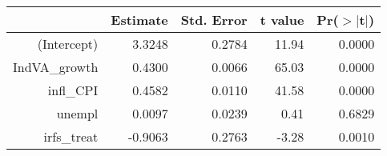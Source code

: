 \begin{table}[ht]
\centering
\begin{tabular}{rrrrr}
  \hline
 & Estimate & Std. Error & t value & Pr($>$$|$t$|$) \\ 
  \hline
(Intercept) & 3.3248 & 0.2784 & 11.94 & 0.0000 \\ 
  IndVA\_growth & 0.4300 & 0.0066 & 65.03 & 0.0000 \\ 
  infl\_CPI & 0.4582 & 0.0110 & 41.58 & 0.0000 \\ 
  unempl & 0.0097 & 0.0239 & 0.41 & 0.6829 \\ 
  irfs\_treat & -0.9063 & 0.2763 & -3.28 & 0.0010 \\ 
   \hline
\end{tabular}
\end{table}
